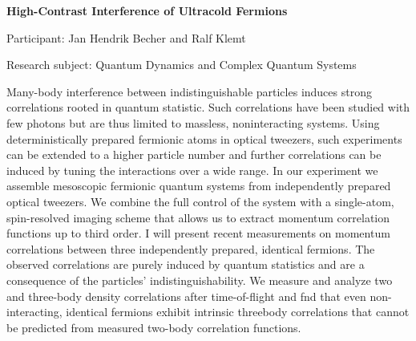 \hfill 

\hfill 

\begin{minipage}[t]{1.0\textwidth}

\begin{center}

{{\large\bfseries High-Contrast Interference of Ultracold Fermions}\par}

\end{center}

{\noindent Participant: Jan Hendrik Becher and Ralf Klemt\par} 

{\noindent Research subject: Quantum Dynamics and Complex Quantum Systems\par}\medskip

\noindent Many-body interference between indistinguishable particles induces
strong correlations rooted in quantum statistic. Such correlations have
been studied with few photons but are thus limited to massless, noninteracting systems. Using deterministically prepared fermionic atoms
in optical tweezers, such experiments can be extended to a higher particle number and further correlations can be induced by tuning the
interactions over a wide range.
In our experiment we assemble mesoscopic fermionic quantum systems from independently prepared optical tweezers. We combine the
full control of the system with a single-atom, spin-resolved imaging
scheme that allows us to extract momentum correlation functions up
to third order.
I will present recent measurements on momentum correlations between three independently prepared, identical fermions. The observed
correlations are purely induced by quantum statistics and are a consequence of the particles’ indistinguishability. We measure and analyze
two and three-body density correlations after time-of-ﬂight and fnd
that even non-interacting, identical fermions exhibit intrinsic threebody correlations that cannot be predicted from measured two-body
correlation functions.\par\end{minipage}

\hfill 


